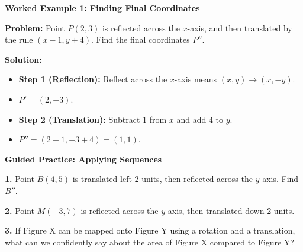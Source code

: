 \documentclass[12pt, letterpaper, fleqn]{article}
\begin{document}
\begin{tcolorbox}[colback=white, colframe=black!25, boxrule=0.6pt, arc=4mm, left=6mm, right=6mm, top=5mm, bottom=5mm]

\textbf{Worked Example 1: Finding Final Coordinates}

\medskip

\textbf{Problem:} Point $P(2, 3)$ is reflected across the $x$-axis, and then translated by the rule $(x-1, y+4)$. Find the final coordinates $P''$.

\medskip

\textbf{Solution:}
\begin{itemize}
    \item \textbf{Step 1 (Reflection):} Reflect across the $x$-axis means $(x, y) \rightarrow (x, -y)$. 
    \item $P' = (2, -3)$.
    \item \textbf{Step 2 (Translation):} Subtract 1 from $x$ and add 4 to $y$.
    \item $P'' = (2 - 1, -3 + 4) = (1, 1)$.
\end{itemize}

\end{tcolorbox}

\vspace{4mm}

\begin{tcolorbox}[colback=white!15, colframe=black, boxrule=1.5pt, arc=4mm, left=6mm, right=6mm, top=5mm, bottom=5mm]

\textbf{Guided Practice: Applying Sequences}

\medskip

\noindent
\textbf{1.} Point $B(4, 5)$ is translated left 2 units, then reflected across the $y$-axis. Find $B''$. 
\vspace{1.5cm}

\noindent
\textbf{2.} Point $M(-3, 7)$ is reflected across the $y$-axis, then translated down 2 units. 
\vspace{1.5cm}

\noindent
\textbf{3.} If Figure X can be mapped onto Figure Y using a rotation and a translation, what can we confidently say about the area of Figure X compared to Figure Y? 
\vspace{1.5cm}

\end{tcolorbox}
\end{document}
